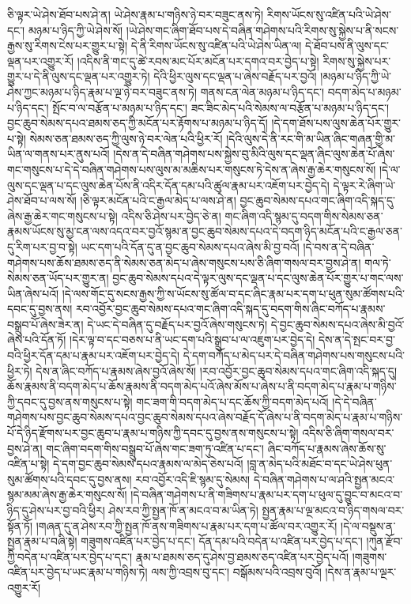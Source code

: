 ཅི་ལྟར་ཡེ་ཤེས་ཐོབ་པས་ཤེ་ན། ཡེ་ཤེས་རྣམ་པ་གཉིས་ཉེ་བར་བཟུང་ནས་ཏེ། རིགས་ཡོངས་སུ་འཛིན་པའི་ཡེ་ཤེས་དང་། མཉམ་པ་ཉིད་ཀྱི་ཡེ་ཤེས་སོ། །ཡེ་ཤེས་གང་ཞིག་ཐོབ་པས་དེ་བཞིན་གཤེགས་པའི་རིགས་སུ་སྐྱེས་པ་ནི་སངས་རྒྱས་སུ་རིགས་ངེས་པར་གྱུར་པ་སྟེ། དེ་ནི་རིགས་ཡོངས་སུ་འཛིན་པའི་ཡེ་ཤེས་ཡིན་ལ། དེ་ཐོབ་པས་ནི་ལུས་དང་ལྡན་པར་འགྱུར་རོ། །འདིས་ནི་གང་དུ་ཚེ་རབས་མང་པོར་མངོན་པར་དགའ་བར་བྱེད་པ་སྟེ། རིགས་སུ་སྐྱེས་པར་གྱུར་པ་དེ་ནི་ལུས་དང་ལྡན་པར་འགྱུར་ཏེ། དེའི་ཕྱིར་ལུས་དང་ལྡན་པ་ཞེས་བརྗོད་པར་བྱའོ། །མཉམ་པ་ཉིད་ཀྱི་ཡེ་ཤེས་ཀྱང་མཉམ་པ་ཉིད་རྣམ་པ་ལྔ་ཉེ་བར་བཟུང་ནས་ཏེ། གནས་ངན་ལེན་མཉམ་པ་ཉིད་དང་། བདག་མེད་པ་མཉམ་པ་ཉིད་དང་། སྤོང་བ་ལ་བརྩོན་པ་མཉམ་པ་ཉིད་དང་། ཟང་ཟིང་མེད་པའི་སེམས་ལ་བརྩོན་པ་མཉམ་པ་ཉིད་དང་། བྱང་ཆུབ་སེམས་དཔའ་ཐམས་ཅད་ཀྱི་མངོན་པར་རྟོགས་པ་མཉམ་པ་ཉིད་དོ། །དེ་དག་ཐོས་པས་ལུས་ཆེན་པོར་གྱུར་པ་སྟེ། སེམས་ཅན་ཐམས་ཅད་ཀྱི་ལུས་ཉེ་བར་ལེན་པའི་ཕྱིར་རོ། །དེའི་ལུས་དེ་ནི་རང་གི་མ་ཡིན་ཞིང་གཞན་གྱི་མ་ཡིན་ལ་གནས་པར་ནུས་པའོ། །དེས་ན་དེ་བཞིན་གཤེགས་པས་སྐྱེས་བུ་མིའི་ལུས་དང་ལྡན་ཞིང་ལུས་ཆེན་པོ་ཞེས་གང་གསུངས་པ་དེ་དེ་བཞིན་གཤེགས་པས་ལུས་མ་མཆིས་པར་གསུངས་ཏེ་དེས་ན་ཞེས་རྒྱ་ཆེར་གསུངས་སོ། །དེ་ལ་ལུས་དང་ལྡན་པ་དང་ལུས་ཆེན་པོས་ནི་འདིར་དོན་དམ་པའི་ཚུལ་རྣམ་པར་འཇོག་པར་བྱེད་དེ། དེ་ལྟར་རེ་ཞིག་ཡེ་ཤེས་ཐོབ་པ་ལས་སོ། །ཅི་ལྟར་མངོན་པའི་ང་རྒྱལ་མེད་པ་ལས་ཤེ་ན། བྱང་ཆུབ་སེམས་དཔའ་གང་ཞིག་འདི་སྐད་དུ་ཞེས་རྒྱ་ཆེར་གང་གསུངས་པ་སྟེ། འདིས་ཅི་ཤེས་པར་བྱེད་ཅེ་ན། གང་ཞིག་འདི་སྙམ་དུ་བདག་གིས་སེམས་ཅན་རྣམས་ཡོངས་སུ་མྱ་ངན་ལས་འདའ་བར་བྱའོ་སྙམ་ན་བྱང་ཆུབ་སེམས་དཔའ་དེ་བདག་ཉིད་མངོན་པའི་ང་རྒྱལ་ཅན་དུ་རིག་པར་བྱ་བ་སྟེ། ཡང་དག་པའི་དོན་དུ་ན་བྱང་ཆུབ་སེམས་དཔའ་ཞེས་མི་བྱ་བའོ། །དེ་བས་ན་དེ་བཞིན་གཤེགས་པས་ཆོས་ཐམས་ཅད་ནི་སེམས་ཅན་མེད་པ་ཞེས་གསུངས་པས་ཅི་ཞིག་གསལ་བར་བྱས་ཤེ་ན། གལ་ཏེ་སེམས་ཅན་ཡོད་པར་གྱུར་ན། བྱང་ཆུབ་སེམས་དཔའ་དེ་ལྟར་ལུས་དང་ལྡན་པ་དང་ལུས་ཆེན་པོར་གྱུར་པ་གང་ལས་ཡིན་ཞེས་པའོ། །དེ་ལས་གོང་དུ་སངས་རྒྱས་ཀྱི་ས་ཡོངས་སུ་ཚོལ་བ་དང་ཞིང་རྣམ་པར་དག་པ་ཕུན་སུམ་ཚོགས་པའི་དབང་དུ་བྱས་ནས། རབ་འབྱོར་བྱང་ཆུབ་སེམས་དཔའ་གང་ཞིག་འདི་སྐད་དུ་བདག་གིས་ཞིང་བཀོད་པ་རྣམས་བསྒྲུབ་པོ་ཞེས་ཟེར་ན། དེ་ཡང་དེ་བཞིན་དུ་བརྗོད་པར་བྱའོ་ཞེས་གསུངས་ཏེ། དེ་བྱང་ཆུབ་སེམས་དཔའ་ཞེས་མི་བྱའོ་ཞེས་པའི་དོན་ཏོ། །དེར་ལྟ་བ་དང་བཅས་པ་ནི་ཡང་དག་པའི་སྒྲུབ་པ་ལ་འཇུག་པར་བྱེད་དེ། དེས་ན་དེ་སྤང་བར་བྱ་བའི་ཕྱིར་དོན་དམ་པ་རྣམ་པར་འཇོག་པར་བྱེད་དེ། དེ་དག་བཀོད་པ་མེད་པར་དེ་བཞིན་གཤེགས་པས་གསུངས་པའི་ཕྱིར་ཏེ། དེས་ན་ཞིང་བཀོད་པ་རྣམས་ཞེས་བྱའོ་ཞེས་སོ། །རབ་འབྱོར་བྱང་ཆུབ་སེམས་དཔའ་གང་ཞིག་འདི་སྐད་དུ། ཆོས་རྣམས་ནི་བདག་མེད་པ་ཆོས་རྣམས་ནི་བདག་མེད་པའོ་ཞེས་མོས་པ་ཞེས་པ་ནི་བདག་མེད་པ་རྣམ་པ་གཉིས་ཀྱི་དབང་དུ་བྱས་ནས་གསུངས་པ་སྟེ། གང་ཟག་གི་བདག་མེད་པ་དང་ཆོས་ཀྱི་བདག་མེད་པའོ། །དེ་དེ་བཞིན་གཤེགས་པས་བྱང་ཆུབ་སེམས་དཔའ་བྱང་ཆུབ་སེམས་དཔའ་ཞེས་བརྗོད་དོ་ཞེས་པ་ནི་བདག་མེད་པ་རྣམ་པ་གཉིས་པོ་དེ་ཉིད་རྫོགས་པར་བྱང་ཆུབ་པ་རྣམ་པ་གཉིས་ཀྱི་དབང་དུ་བྱས་ནས་གསུངས་པ་སྟེ། འདིས་ཅི་ཞིག་གསལ་བར་བྱས་ཤེ་ན། གང་ཞིག་བདག་གིས་བསྒྲུབ་པོ་ཞེས་གང་ཟག་ཏུ་འཛིན་པ་དང་། ཞིང་བཀོད་པ་རྣམས་ཞེས་ཆོས་སུ་འཛིན་པ་སྟེ། དེ་དག་བྱང་ཆུབ་སེམས་དཔའ་རྣམས་ལ་མེད་ཅེས་པའོ། །བླ་ན་མེད་པའི་མཐོང་བ་དང་ཡེ་ཤེས་ཕུན་སུམ་ཚོགས་པའི་དབང་དུ་བྱས་ནས། རབ་འབྱོར་འདི་ཇི་སྙམ་དུ་སེམས། དེ་བཞིན་གཤེགས་པ་ལ་ཤའི་སྤྱན་མངའ་སྙམ་མམ་ཞེས་རྒྱ་ཆེར་གསུངས་སོ། །དེ་བཞིན་གཤེགས་པ་ནི་གཟིགས་པ་རྣམ་པར་དག་པ་ཕུལ་དུ་བྱུང་བ་མངའ་བ་ཉིད་དུ་ཤེས་པར་བྱ་བའི་ཕྱིར། ཤེས་རབ་ཀྱི་སྤྱན་ཁོ་ན་མངའ་བ་མ་ཡིན་ཏེ། སྤྱན་རྣམ་པ་ལྔ་མངའ་བ་ཉིད་གསལ་བར་སྟོན་ཏོ། །གཞན་དུ་ན་ཤེས་རབ་ཀྱི་སྤྱན་ཁོ་ནས་གཟིགས་པ་རྣམ་པར་དག་པ་ཚོལ་བར་འགྱུར་རོ། །དེ་ལ་བསྡུས་ན་སྤྱན་རྣམ་པ་བཞི་སྟེ། གཟུགས་འཛིན་པར་བྱེད་པ་དང་། དོན་དམ་པའི་བདེན་པ་འཛིན་པར་བྱེད་པ་དང་། །ཀུན་རྫོབ་ཀྱི་བདེན་པ་འཛིན་པར་བྱེད་པ་དང་། རྣམ་པ་ཐམས་ཅད་དུ་ཤེས་བྱ་ཐམས་ཅད་འཛིན་པར་བྱེད་པའོ། །གཟུགས་འཛིན་པར་བྱེད་པ་ཡང་རྣམ་པ་གཉིས་ཏེ། ལས་ཀྱི་འབྲས་བུ་དང་། བསྒོམས་པའི་འབྲས་བུའོ། །དེས་ན་རྣམ་པ་ལྔར་འགྱུར་རོ། 